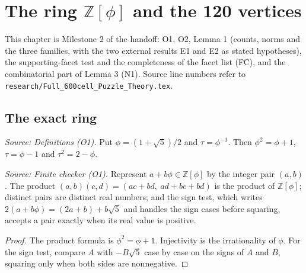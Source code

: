 \chapter{The ring \texorpdfstring{\(\mathbb Z[\phi]\)}{Z[phi]} and the 120 vertices}
\label{ch:ArchonFull600Theory_Geometry}

This chapter is Milestone 2 of the handoff: O1, O2, Lemma 1 (counts, norms
and the three families, with the two external results E1 and E2 as stated
hypotheses), the supporting-facet test and the completeness of the facet
list (FC), and the combinatorial part of Lemma 3 (N1). Source line numbers
refer to \texttt{research/Full\_600cell\_Puzzle\_Theory.tex}.

\section{The exact ring}

\begin{definition}
  \label{def:golden-ratio}
  \leanok
  \textit{Source: Definitions (O1).}
  Put \(\phi=(1+\sqrt5)/2\) and \(\tau=\phi^{-1}\). Then
  \(\phi^2=\phi+1\), \(\tau=\phi-1\) and \(\tau^2=2-\phi\).
\end{definition}

\begin{lemma}
  \label{lem:pair-arithmetic}
  \leanok
  \textit{Source: Finite checker (O1).}
  Represent \(a+b\phi\in\mathbb Z[\phi]\) by the integer pair \((a,b)\).
  The product \((a,b)(c,d)=(ac+bd,\ ad+bc+bd)\) is the product of
  \(\mathbb Z[\phi]\); distinct pairs are distinct real numbers; and the
  sign test, which writes \(2(a+b\phi)=(2a+b)+b\sqrt5\) and handles the sign
  cases before squaring, accepts a pair exactly when its real value is
  positive.
\end{lemma}
\begin{proof}
  \leanok
  The product formula is \(\phi^2=\phi+1\). Injectivity is the
  irrationality of \(\phi\). For the sign test, compare \(A\) with
  \(-B\sqrt5\) case by case on the signs of \(A\) and \(B\), squaring only
  when both sides are nonnegative.
\end{proof}


